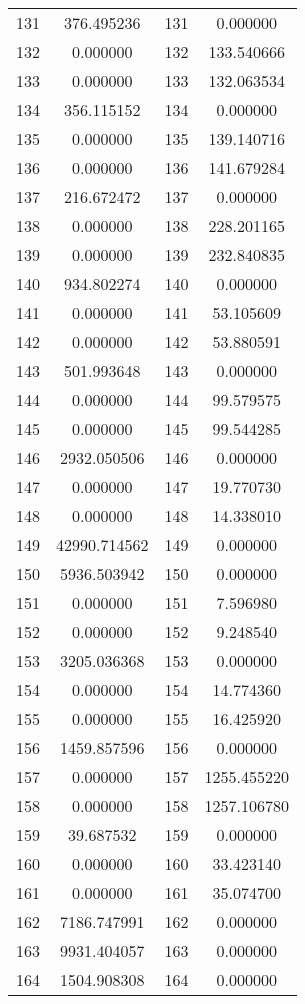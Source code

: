 \documentclass[12pt]{article}
\begin{document}
\begin{longtable}{@{}cccc@{}}
131 & 376.495236 & 131 & 0.000000 \\
132 & 0.000000 & 132 & 133.540666 \\
133 & 0.000000 & 133 & 132.063534 \\
134 & 356.115152 & 134 & 0.000000 \\
135 & 0.000000 & 135 & 139.140716 \\
136 & 0.000000 & 136 & 141.679284 \\
137 & 216.672472 & 137 & 0.000000 \\
138 & 0.000000 & 138 & 228.201165 \\
139 & 0.000000 & 139 & 232.840835 \\
140 & 934.802274 & 140 & 0.000000 \\
141 & 0.000000 & 141 & 53.105609 \\
142 & 0.000000 & 142 & 53.880591 \\
143 & 501.993648 & 143 & 0.000000 \\
144 & 0.000000 & 144 & 99.579575 \\
145 & 0.000000 & 145 & 99.544285 \\
146 & 2932.050506 & 146 & 0.000000 \\
147 & 0.000000 & 147 & 19.770730 \\
148 & 0.000000 & 148 & 14.338010 \\
149 & 42990.714562 & 149 & 0.000000 \\
150 & 5936.503942 & 150 & 0.000000 \\
151 & 0.000000 & 151 & 7.596980 \\
152 & 0.000000 & 152 & 9.248540 \\
153 & 3205.036368 & 153 & 0.000000 \\
154 & 0.000000 & 154 & 14.774360 \\
155 & 0.000000 & 155 & 16.425920 \\
156 & 1459.857596 & 156 & 0.000000 \\
157 & 0.000000 & 157 & 1255.455220 \\
158 & 0.000000 & 158 & 1257.106780 \\
159 & 39.687532 & 159 & 0.000000 \\
160 & 0.000000 & 160 & 33.423140 \\
161 & 0.000000 & 161 & 35.074700 \\
162 & 7186.747991 & 162 & 0.000000 \\
163 & 9931.404057 & 163 & 0.000000 \\
164 & 1504.908308 & 164 & 0.000000 \\

\end{longtable}
\end{document}
